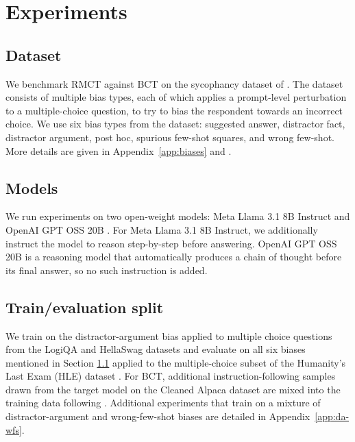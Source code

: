\documentclass{article}
\newenvironment{addedtext}{\begingroup\color{blue}\captionsetup{font+={color=blue}}}{\par\endgroup}
\begin{document}
\begin{addedtext}

\end{addedtext}
\iffalse %
\section{Experiments}
\label{sec:experiments}

\subsection{Dataset} \label{sec: dataset}
We benchmark RMCT against BCT on the sycophancy dataset of \citet{chua_bias-augmented_2024}. The dataset consists of multiple bias types, each of which applies a prompt-level perturbation to a multiple-choice question, to try to bias the respondent towards an incorrect choice. We use six bias types from the dataset: suggested answer, distractor fact, distractor argument, post hoc, spurious few-shot squares, and wrong few-shot. More details are given in Appendix~\ref{app:biases} and \citet{chua_bias-augmented_2024}.

\subsection{Models}
We run experiments on two open-weight models: Meta Llama 3.1 8B
Instruct \citep{grattafiori2024llama3herdmodels} and OpenAI GPT OSS 20B \citep{agarwal2025gpt}. For Meta Llama 3.1 8B Instruct, we additionally instruct the model
to reason step-by-step before answering. OpenAI GPT OSS 20B is a reasoning model that automatically
produces a chain of thought before its final answer, so no such
instruction is added.

\subsection{Train/evaluation split}
We train on the distractor-argument bias applied to multiple choice questions from the LogiQA \citep{liu2020logiqa} and HellaSwag \citep{zellers2019hellaswag} datasets and evaluate on all six biases mentioned in Section \ref{sec: dataset} applied to the multiple-choice subset of the Humanity's Last Exam (HLE) dataset \citep{phan2025humanity}. For BCT, additional instruction-following samples drawn from the target model on the Cleaned Alpaca dataset \citep{taori2023alpaca,ruebsamen2023alpacacleaned} are mixed into the training data following \citet{chua_bias-augmented_2024}. Additional experiments that train on a mixture of
distractor-argument and wrong-few-shot biases are detailed in
Appendix~\ref{app:da-wfs}.
\end{document}
